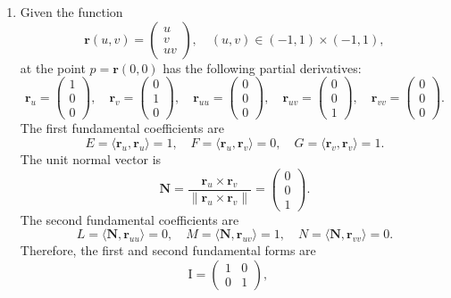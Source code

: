 \documentclass[12pt]{article}
\begin{document}
\begin{enumerate}
  \item Given the function \[         \mathbf{r}(u,v) = \begin{pmatrix} u \\ v \\ uv\end{pmatrix},\quad (u,v) \in (-1,1) \times (-1, 1),       \]
        at the point \(p = \mathbf{r}(0,0)\) has the following partial derivatives:
        \[
          \mathbf{r}_u = \begin{pmatrix} 1 \\ 0 \\ 0 \end{pmatrix},\quad
          \mathbf{r}_v = \begin{pmatrix} 0 \\ 1 \\ 0 \end{pmatrix},\quad
          \mathbf{r}_{uu} = \begin{pmatrix} 0 \\ 0 \\ 0 \end{pmatrix},\quad
          \mathbf{r}_{uv} = \begin{pmatrix} 0 \\ 0 \\ 1 \end{pmatrix},\quad
          \mathbf{r}_{vv} = \begin{pmatrix} 0 \\ 0 \\ 0 \end{pmatrix}.
        \]
        The first fundamental coefficients are
        \[
          E = \langle \mathbf{r}_u, \mathbf{r}_u \rangle = 1, \quad
          F = \langle \mathbf{r}_u, \mathbf{r}_v \rangle = 0, \quad
          G = \langle \mathbf{r}_v, \mathbf{r}_v \rangle = 1.
        \]
        The unit normal vector is
        \[
        \mathbf{N} = \frac{\mathbf{r}_u \times \mathbf{r}_v}{\|\mathbf{r}_u \times \mathbf{r}_v\|} = \begin{pmatrix} 0 \\ 0 \\ 1 \end{pmatrix}.
        \]
        The second fundamental coefficients are
        \[
          L = \langle \mathbf{N}, \mathbf{r}_{uu} \rangle = 0, \quad
          M = \langle \mathbf{N}, \mathbf{r}_{uv} \rangle = 1, \quad
          N = \langle \mathbf{N}, \mathbf{r}_{vv} \rangle = 0.
        \]
        Therefore, the first and second fundamental forms are
        \[
          \mathrm{I} = \begin{pmatrix} 1 & 0 \\ 0 & 1 \end{pmatrix}, \quad
\]
\end{enumerate}
\end{document}

